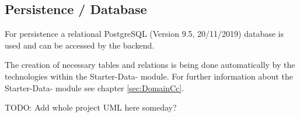 \subsection{Persistence / Database}
\label{sec:DomainCd}

For persistence a relational PostgreSQL (Version 9.5, 20/11/2019) database is used and can be accessed by the backend. 

The creation of necessary tables and relations is being done automatically by the technologies within the Starter-Data- module. For further information about the Starter-Data- module see chapter \ref{sec:DomainCc}.

TODO: Add whole project UML here someday?

